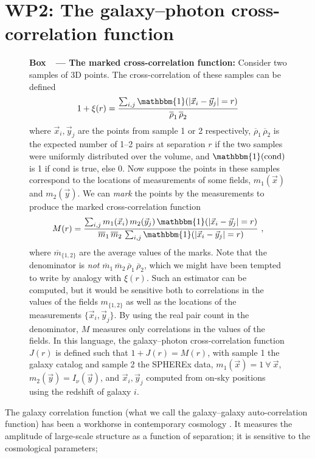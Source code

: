 \documentclass[12pt]{article}
\newcommand{\paragraphskip}{\medskip}
\renewcommand{\paragraph}[1]{\par\paragraphskip\noindent\textbf{#1}}
\newcounter{box}
\newcommand{\boxname}{Box}
\newenvironment{explainer}[1][something random]{\begin{figure}[b!]\begin{mdframed}[roundcorner=2pt, backgroundcolor=black!05]\refstepcounter{box}\paragraph{\boxname~\thebox\ --- {#1}:}}{\end{mdframed}\end{figure}}
\begin{document}
\section*{WP2: The galaxy--photon cross-correlation function}\label{sec:ccf}
\begin{explainer}[The marked cross-correlation function]\label{box:ccf}
    Consider two samples of 3D points.
    The cross-correlation of these samples can be defined
    $$ 1 + \xi(r) = \frac{\sum_{i, j} \mathbbm{1}( |\vec{x}_i - \vec{y}_j| = r ) }{\overline{\rho}_1 \, \overline{\rho}_2} $$
    where $\vec{x}_i, \vec{y}_j$ are the points from sample 1 or 2 respectively, $\overline{\rho}_1 \, \overline{\rho}_2$ is the expected number of 1--2 pairs at separation $r$ if the two samples were uniformly distributed over the volume, and $\mathbbm{1}(\text{cond})$ is 1 if $\text{cond}$ is true, else 0.
    Now suppose the points in these samples correspond to the locations of measurements of some fields, $m_1 (\vec{x})$ and $m_2 (\vec{y})$.
    We can \textit{mark} the points by the measurements to produce the marked cross-correlation function \citep{Rutherford+2021}
    $$ M(r) = \frac{\sum_{i, j} m_1(\vec{x}_i) \, m_2(\vec{y}_j) \, \mathbbm{1}( |\vec{x}_i - \vec{y}_j| = r ) }{ \overline{m}_1 \, \overline{m}_2 \, \sum_{i, j} \mathbbm{1}( |\vec{x}_i - \vec{y}_j| = r ) } ~, $$
    where $\overline{m}_{\{ 1, 2 \}}$ are the average values of the marks.
    Note that the denominator is \textit{not} $\overline{m}_1 \, \overline{m}_2 \, \overline{\rho}_1 \, \overline{\rho}_2$, which we might have been tempted to write by analogy with $\xi(r)$.
    Such an estimator can be computed, but it would be sensitive both to correlations in the values of the fields $m_{\{1,2\}}$ as well as the locations of the measurements $\{ \vec{x}_i, \vec{y}_j \}$.
    By using the real pair count in the denominator, $M$ measures only correlations in the values of the fields.
    In this language, the galaxy--photon cross-correlation function $J(r)$ is defined such that $1 + J(r) = M(r)$, with sample 1 the galaxy catalog and sample 2 the SPHEREx data, $m_1 (\vec{x}) = 1 \ \forall \ \vec{x}$, $m_2 (\vec{y}) = I_\nu (\vec{y})$, and $\vec{x}_i, \vec{y}_j$ computed from on-sky positions using the redshift of galaxy $i$.
\end{explainer}
The galaxy correlation function (what we call the galaxy--galaxy auto-correlation function) has been a workhorse in contemporary cosmology \cite{acf}.
It measures the amplitude of large-scale structure as a function of separation;
it is sensitive to the cosmological parameters;
\end{document}
